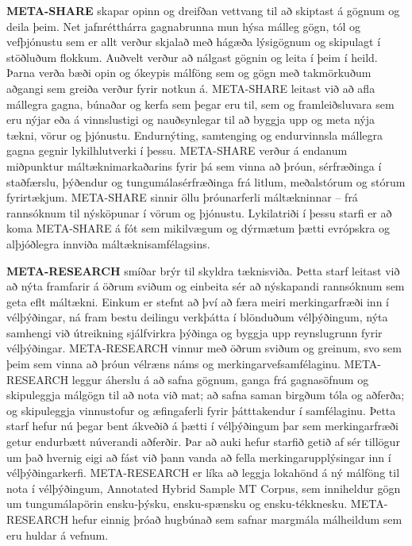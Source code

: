 \documentclass{../../metanetpaper}
\begin{document}
\begin{multicols}{2}
\textbf{META-SHARE} skapar opinn og dreifðan vettvang til að skiptast á gögnum og deila þeim. Net jafnrétthárra gagnabrunna mun hýsa málleg gögn, tól og vefþjónustu sem er allt verður skjalað með hágæða lýsigögnum og skipulagt í stöðluðum flokkum. Auðvelt verður að nálgast gögnin og leita í þeim í heild. Þarna verða bæði opin og ókeypis málföng sem og gögn með takmörkuðum aðgangi sem greiða verður fyrir notkun á. META-SHARE leitast við að afla mállegra gagna, búnaðar og kerfa sem þegar eru til, sem og framleiðsluvara sem eru nýjar eða á vinnslustigi og nauðsynlegar til að byggja upp og meta nýja tækni, vörur og þjónustu. Endurnýting, samtenging og endurvinnsla mállegra gagna gegnir lykilhlutverki í þessu. META-SHARE verður á endanum miðpunktur máltæknimarkaðarins fyrir þá sem vinna að þróun, sérfræðinga í staðfærslu, þýðendur og tungumálasérfræðinga frá litlum, meðalstórum og stórum fyrirtækjum. META-SHARE sinnir öllu þróunarferli máltækninnar -- frá rannsóknum til nýsköpunar í vörum og þjónustu. Lykilatriði í þessu starfi er að koma META-SHARE á fót sem mikilvægum og dýrmætum þætti evrópskra og alþjóðlegra innviða máltæknisamfélagsins. 

\textbf{META-RESEARCH} smíðar brýr til skyldra tæknisviða. Þetta starf leitast við að nýta framfarir á öðrum sviðum og einbeita sér að nýskapandi rannsóknum sem geta eflt máltækni. Einkum er stefnt að því að færa meiri merkingarfræði inn í vélþýðingar, ná fram bestu deilingu verkþátta í blönduðum vélþýðingum, nýta samhengi við útreikning sjálfvirkra þýðinga og byggja upp reynslugrunn fyrir vélþýðingar. META-RESEARCH vinnur með öðrum sviðum og greinum, svo sem þeim sem vinna að þróun vélræns náms og merkingarvefsamfélaginu. META-RESEARCH leggur áherslu á að safna gögnum, ganga frá gagnasöfnum og skipuleggja málgögn til að nota við mat; að safna saman birgðum tóla og aðferða; og skipuleggja vinnustofur og æfingaferli fyrir þátttakendur í samfélaginu. Þetta starf hefur nú þegar bent ákveðið á þætti í vélþýðingum þar sem merkingarfræði getur endurbætt núverandi aðferðir. Þar að auki hefur starfið getið af sér tillögur um það hvernig eigi að fást við þann vanda að fella merkingarupplýsingar inn í vélþýðingarkerfi. META-RESEARCH er líka að leggja lokahönd á ný málföng til nota í vélþýðingum, Annotated Hybrid Sample MT Corpus, sem inniheldur gögn um tungumálapörin ensku-þýsku, ensku-spænsku og ensku-tékknesku. META-RESEARCH hefur einnig þróað hugbúnað sem safnar margmála málheildum sem eru huldar á vefnum.
\end{multicols}
\end{document}
